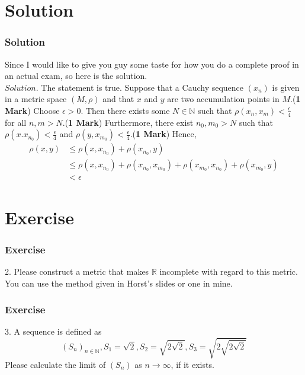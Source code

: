 \documentclass[12pt, t]{beamer}
\begin{document}
\section{Solution}
\begin{frame}
    \frametitle{Solution}
    Since I would like to give you guy some taste for how you do a complete proof in an actual exam, so here is the solution.\\
    \vspace{2em}
    $Solution.$\hspace{1em} The statement is true. Suppose that a Cauchy sequence $(x_n)$ is given in a metric space $(M,\rho)$ and that
    $x$ and $y$ are two accumulation points in $M$.(\textbf{1 Mark}) Choose $\epsilon>0$. Then there exists some $N\in\mathbb{N}$ such that
    $\rho(x_n,x_m)<\frac{\epsilon}{4}$ for all $n,m>N$.(\textbf{1 Mark}) Furthermore, there exist $n_0,m_0>N$ such  that $\rho(x.x_{n_0})<\frac{\epsilon}{4}$ and
    $\rho(y,x_{m_0})<\frac{\epsilon}{4}$.(\textbf{1 Mark}) Hence,
    \begin{equation*}
        \begin{split}
            \rho(x,y)&\leq\rho(x,x_{n_0})+\rho(x_{n_0},y)\\
            &\leq\rho(x,x_{n_0})+\rho(x_{n_0},x_{m_0})+\rho(x_{m_0},x_{n_0})+\rho(x_{m_0},y)\\
            &<\epsilon
        \end{split}
    \end{equation*}
\end{frame}

\section{Exercise}
\begin{frame}
    \frametitle{Exercise}
    2. Please construct a metric that makes $\mathbb{R}$ incomplete with regard to this metric. You can use the method given in
    Horst's slides or one in mine.
\end{frame}

\begin{frame}
    \frametitle{Exercise}
    3. A sequence is defined as
    \begin{equation*}
        (S_n)_{n\in\mathbb{N}}, S_1=\sqrt{2}, S_2=\sqrt{2\sqrt{2}}, S_3=\sqrt{2\sqrt{2\sqrt{2}}}
    \end{equation*}
    Please calculate the limit of $(S_n)$ as $n\rightarrow \infty$, if it exists.
\end{frame}
\end{document}
